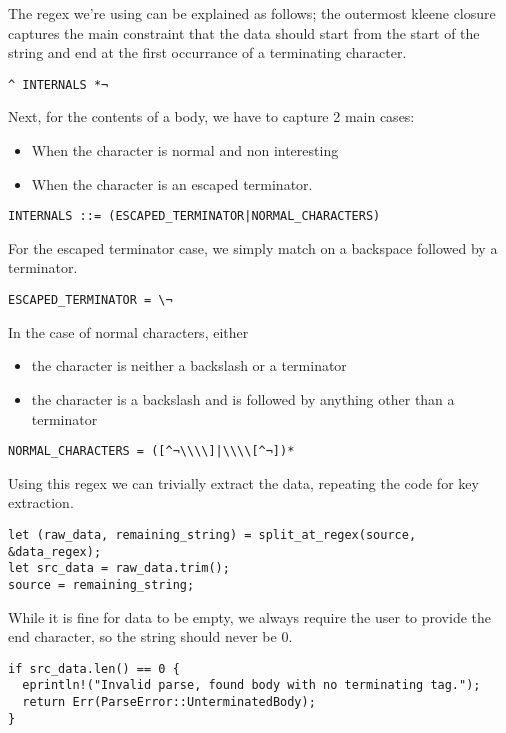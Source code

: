 \documentclass[11pt]{article}
\begin{document}
The regex we're using can be explained as follows; the outermost kleene closure captures the main constraint that the data should start from the start of the string and end at the first occurrance
of a terminating character.
\begin{verbatim}
^ INTERNALS *¬
\end{verbatim}

Next, for the contents of a body, we have to capture 2 main cases:
\begin{itemize}
\item When the character is normal and non interesting
\item When the character is an escaped terminator.
\end{itemize}
\begin{verbatim}
INTERNALS ::= (ESCAPED_TERMINATOR|NORMAL_CHARACTERS)
\end{verbatim}

For the escaped terminator case, we simply match on a backspace followed by a terminator.
\begin{verbatim}
ESCAPED_TERMINATOR = \¬
\end{verbatim}

In the case of normal characters, either 
\begin{itemize}
\item the character is neither a backslash or a terminator
\item the character is a backslash and is followed by anything other than a terminator
\end{itemize}
\begin{verbatim}
NORMAL_CHARACTERS = ([^¬\\\\]|\\\\[^¬])*
\end{verbatim}

Using this regex we can trivially extract the data, repeating the code for key extraction.
\begin{verbatim}
let (raw_data, remaining_string) = split_at_regex(source, &data_regex);
let src_data = raw_data.trim();
source = remaining_string;
\end{verbatim}

While it is fine for data to be empty, we always require the user to provide the end character, so the string should never be 0.
\begin{verbatim}
if src_data.len() == 0 {
  eprintln!("Invalid parse, found body with no terminating tag.");
  return Err(ParseError::UnterminatedBody);
}
\end{verbatim}
\end{document}
